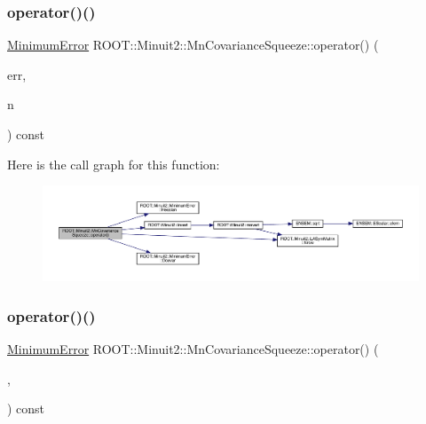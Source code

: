 \mbox{\label{classROOT_1_1Minuit2_1_1MnCovarianceSqueeze_a6f1ea9726d0981faacf7ee0c26326bcd}} 
\subsubsection{\texorpdfstring{operator()()}{operator()()}\hspace{0.1cm}{\footnotesize\ttfamily [4/9]}}
{\footnotesize\ttfamily \mbox{\hyperlink{classROOT_1_1Minuit2_1_1MinimumError}{Minimum\+Error}} R\+O\+O\+T\+::\+Minuit2\+::\+Mn\+Covariance\+Squeeze\+::operator() (\begin{DoxyParamCaption}\item[{const \mbox{\hyperlink{classROOT_1_1Minuit2_1_1MinimumError}{Minimum\+Error}} \&}]{err,  }\item[{unsigned int}]{n }\end{DoxyParamCaption}) const}

Here is the call graph for this function\+:
\nopagebreak
\begin{figure}[H]
\begin{center}
\leavevmode
\includegraphics[width=350pt]{dc/d44/classROOT_1_1Minuit2_1_1MnCovarianceSqueeze_a6f1ea9726d0981faacf7ee0c26326bcd_cgraph}
\end{center}
\end{figure}
\mbox{\label{classROOT_1_1Minuit2_1_1MnCovarianceSqueeze_a6f1ea9726d0981faacf7ee0c26326bcd}} 
\subsubsection{\texorpdfstring{operator()()}{operator()()}\hspace{0.1cm}{\footnotesize\ttfamily [5/9]}}
{\footnotesize\ttfamily \mbox{\hyperlink{classROOT_1_1Minuit2_1_1MinimumError}{Minimum\+Error}} R\+O\+O\+T\+::\+Minuit2\+::\+Mn\+Covariance\+Squeeze\+::operator() (\begin{DoxyParamCaption}\item[{const \mbox{\hyperlink{classROOT_1_1Minuit2_1_1MinimumError}{Minimum\+Error}} \&}]{,  }\item[{unsigned int}]{ }\end{DoxyParamCaption}) const}


